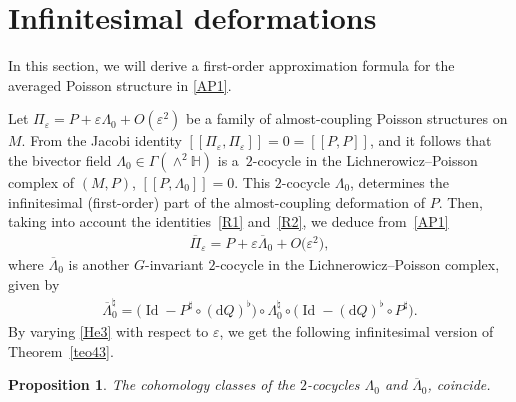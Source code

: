 \documentclass[pdftex]{sigma}
\numberwithin{equation}{section}
\newtheorem{Proposition}[Theorem]{Proposition}
 { \theoremstyle{definition}
\newtheorem{Definition}[Theorem]{Definition}
\newtheorem{Example}[Theorem]{Example}
\newtheorem{Remark}[Theorem]{Remark} }
\begin{document}
\section{Inf\/initesimal deformations}

In this section, we will derive a f\/irst-order approximation formula for the averaged Poisson structure in \eqref{AP1}.

Let $\Pi_{\varepsilon}=P+\varepsilon\Lambda_{0}+O(\varepsilon ^{2})$ be a family of almost-coupling Poisson structures on $M$. From the Jacobi identity $[\![\Pi_{\varepsilon},\Pi_{\varepsilon}]\!]=0=[\![P,P]\!]$, and it follows that the bivector f\/ield $\Lambda_{0}\in\Gamma(\wedge^{2}\mathbb{H})$ is a~$2$-cocycle in the Lichnerowicz--Poisson complex of $(M,P)$, $[\![P,\Lambda_{0}]\!]=0$. This $2$-cocycle $\Lambda_{0}$, determines the inf\/initesimal (f\/irst-order) part of the almost-coupling deformation of $P$. Then, taking into account the identities~\eqref{R1} and~\eqref{R2}, we deduce from~\eqref{AP1}
\begin{gather}\label{He3}
\overline{\Pi}_{\varepsilon}=P+\varepsilon\overline{\Lambda}_{0}+O\big(\varepsilon^{2}\big),
\end{gather}
where $\overline{\Lambda}_{0}$ is another $G$-invariant $2$-cocycle in the Lichnerowicz--Poisson complex, given by
\begin{gather*}
\overline{\Lambda}_{0}^{\natural}=\big( \operatorname{Id}-P^{\sharp}\circ(\mathrm{d}Q)^{\flat}\big) \circ\Lambda_{0}^{\natural}\circ\big(
\operatorname{Id}-(\mathrm{d}Q)^{\flat}\circ P^{\sharp}\big).
\end{gather*}
By varying \eqref{He3} with respect to $\varepsilon$, we get the following inf\/initesimal version of Theorem~\ref{teo43}.

\begin{Proposition}
The cohomology classes of the $2$-cocycles $\Lambda_{0}$ and $\overline{\Lambda}_{0}$, coincide.
\end{Proposition}
\end{document}
